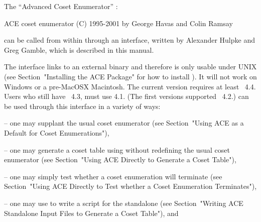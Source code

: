 

The ``Advanced Coset Enumerator'' {\ACE}:

\begintt
ACE coset enumerator (C) 1995-2001 by George Havas and Colin Ramsay
\endtt
{}

can  be called  from within  {\GAP} through  an interface,  written by
Alexander Hulpke and Greg Gamble, which is described in this manual.

The interface links to an external binary and therefore is only usable
under UNIX (see  Section~"Installing  the  ACE  Package"  for  how  to
install  {\ACE}).  It  will  not  work  on  Windows  or  a  pre-MacOSX
Macintosh. The current version requires at least {\GAP}~4.4. Users who
still have {\GAP}~4.3,  must  use  {\ACE}  4.1.  (The  first  versions
supported {\GAP}~4.2.) {\ACE} can be used through this interface in  a
variety of ways:

\beginlist%

\item{--} one may supplant the  usual  {\GAP}  coset  enumerator  (see
Section~"Using ACE as a Default for Coset Enumerations"),

\item{--}  one  may  generate  a  coset  table  using  {\ACE}  without
redefining the usual {\GAP} coset enumerator (see  Section~"Using  ACE
Directly to Generate a Coset Table"),

\item{--} one  may  simply  test  whether  a  coset  enumeration  will
terminate (see Section~"Using ACE Directly to  Test  whether  a  Coset
Enumeration Terminates"),

\item{--} one may  use  {\GAP}  to  write  a  script  for  the  {\ACE}
standalone  (see  Section~"Writing  ACE  Standalone  Input  Files   to
Generate a Coset Table"), and

